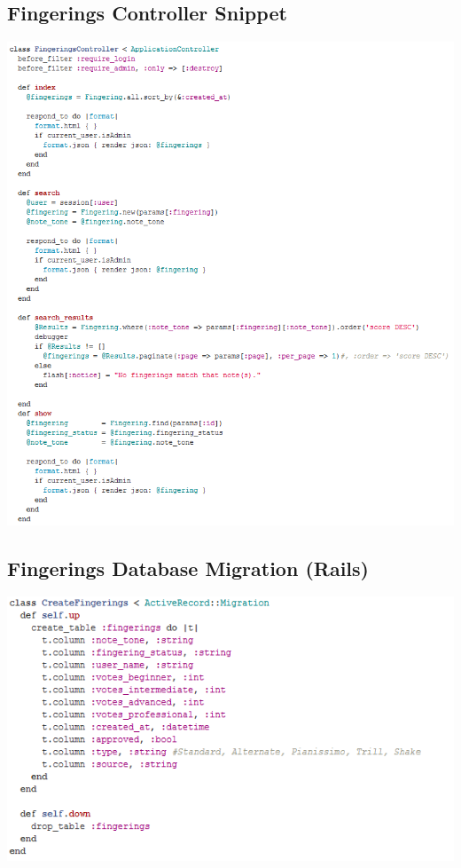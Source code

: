 \documentclass[12pt,english]{article}
\begin{document}
\subsection{Fingerings Controller Snippet}

\includegraphics[scale=0.7]{fingerings_controller}


\subsection{Fingerings Database Migration (Rails)}

\includegraphics[scale=0.7]{database_migration}
\end{document}

